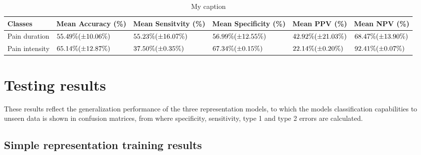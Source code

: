 \documentclass[12pt,a4paper]{article}
\begin{document}
\begin{table}[H]
\centering
\begin{tabular}{|p{2cm}|p{2.2cm}|p{2.2cm}|p{2.2cm}|p{2cm}|p{2cm}|}
\hline
Classes          & Mean Accuracy (\%) & Mean Sensitvity (\%) & Mean Specificity (\%) & Mean PPV (\%) & Mean NPV (\%) \\ \hline
Pain duration & $55.49\%\newline(\pm10.06\%)$ & $55.23\%\newline(\pm16.07\%)$ & $56.99\%\newline(\pm12.55\%)$ & $42.92\%\newline(\pm21.03\%)$ & $68.47\%\newline(\pm13.90\%)$ \\ \hline
Pain intensity   & $65.14\%\newline(\pm12.87\%)$ & $37.50\%\newline(\pm0.35\%)$ & $67.34\%\newline(\pm0.15\%)$ & $22.14\%\newline(\pm0.20\%)$ & $92.41\%\newline(\pm0.07\%)$ \\ \hline
\end{tabular}
\label{my-label}
\caption{My caption}
\end{table}




\section{Testing results}
These results reflect the generalization performance of the three representation models, to which the models classification capabilities to unseen data is shown in confusion matrices, from where specificity, sensitivity, type 1 and type 2 errors are calculated. 


\subsection{Simple representation training results}
\end{document}
